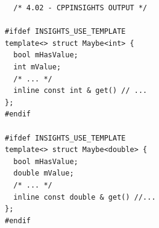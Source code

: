 \begin{verbatim}
  /* 4.02 - CPPINSIGHTS OUTPUT */

#ifdef INSIGHTS_USE_TEMPLATE
template<> struct Maybe<int> {
  bool mHasValue;
  int mValue;
  /* ... */
  inline const int & get() // ...
};
#endif

#ifdef INSIGHTS_USE_TEMPLATE
template<> struct Maybe<double> {
  bool mHasValue;
  double mValue;
  /* ... */
  inline const double & get() //...
};
#endif
\end{verbatim}